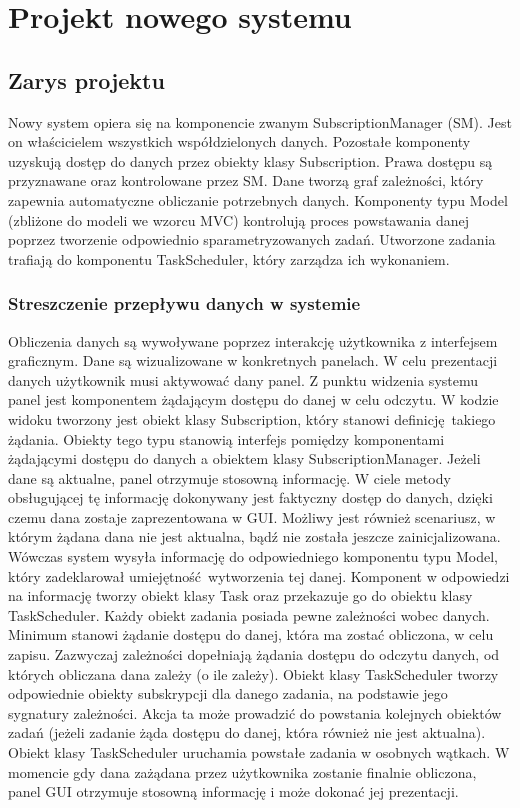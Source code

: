 \chapter{Projekt nowego systemu}

\section{Zarys projektu}
Nowy system opiera się na komponencie zwanym SubscriptionManager (SM). Jest on właścicielem wszystkich współdzielonych danych. Pozostałe komponenty uzyskują dostęp do danych przez obiekty klasy Subscription. Prawa dostępu są przyznawane oraz kontrolowane przez SM. Dane tworzą graf zależności, który zapewnia automatyczne obliczanie potrzebnych danych. Komponenty typu Model (zbliżone do modeli we wzorcu MVC) kontrolują proces powstawania danej poprzez tworzenie odpowiednio sparametryzowanych zadań. Utworzone zadania trafiają do komponentu TaskScheduler, który zarządza ich wykonaniem.

\subsection{Streszczenie przepływu danych w systemie} %

Obliczenia danych są wywoływane poprzez interakcję użytkownika z interfejsem graficznym. Dane są wizualizowane w konkretnych panelach. W celu prezentacji danych użytkownik musi aktywować dany panel. Z punktu widzenia systemu panel jest komponentem żądającym dostępu do danej w celu odczytu. W kodzie widoku tworzony jest obiekt klasy Subscription, który stanowi definicję takiego żądania. Obiekty tego typu stanowią interfejs pomiędzy komponentami żądającymi dostępu do danych a obiektem klasy SubscriptionManager. Jeżeli dane są aktualne, panel otrzymuje stosowną informację. W ciele metody obsługującej tę informację dokonywany jest faktyczny dostęp do danych, dzięki czemu dana zostaje zaprezentowana w GUI. Możliwy jest również scenariusz, w którym żądana dana nie jest aktualna, bądź nie została jeszcze zainicjalizowana. Wówczas system wysyła informację do odpowiedniego komponentu typu Model, który zadeklarował umiejętność wytworzenia tej danej. Komponent w odpowiedzi na informację tworzy obiekt klasy Task oraz przekazuje go do obiektu klasy TaskScheduler. Każdy obiekt zadania posiada pewne zależności wobec danych. Minimum stanowi żądanie dostępu do danej, która ma zostać obliczona, w celu zapisu. Zazwyczaj zależności dopełniają żądania dostępu do odczytu danych, od których obliczana dana zależy (o ile zależy). Obiekt klasy TaskScheduler tworzy odpowiednie obiekty subskrypcji dla danego zadania, na podstawie jego sygnatury zależności. Akcja ta może prowadzić do powstania kolejnych obiektów zadań (jeżeli zadanie żąda dostępu do danej, która również nie jest aktualna). Obiekt klasy TaskScheduler uruchamia powstałe zadania w osobnych wątkach. W momencie gdy dana zażądana przez użytkownika zostanie finalnie obliczona, panel GUI otrzymuje stosowną informację i może dokonać jej prezentacji.




